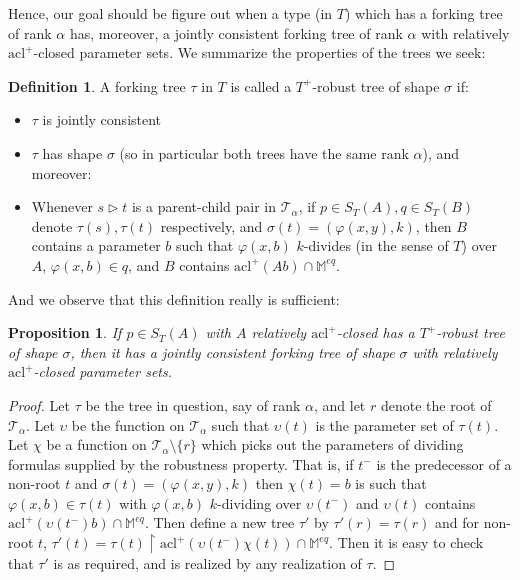 \documentclass{article}
\newtheorem{prop}[theorem]{Proposition}
\theoremstyle{remark}
\theoremstyle{definition}
\newtheorem{definition}[theorem]{Definition}
\begin{document}
Hence, our goal should be figure out when a type (in $T$) which has a forking tree of rank $\alpha$ has, moreover, a jointly consistent forking tree of rank $\alpha$ with relatively $\mathrm{acl}^+$-closed parameter sets. We summarize the properties of the trees we seek:
\begin{definition}
    A forking tree $\tau$ in $T$ is called a $T^+$-robust tree of shape $\sigma$ if:
    \begin{itemize}
        \item $\tau$ is jointly consistent

        \item $\tau$ has shape $\sigma$ (so in particular both trees have the same rank $\alpha$), and moreover:

        \item Whenever $s\triangleright t$ is a parent-child pair in $\mathcal{T}_\alpha$, if $p\in S_T(A), q\in S_T(B)$ denote $\tau(s),\tau(t)$ respectively, and $\sigma(t)=(\varphi(x,y),k)$, then $B$ contains a parameter $b$ such that $\varphi(x,b)$ $k$-divides (in the sense of $T$) over $A$, $\varphi(x,b)\in q$, and $B$ contains $\mathrm{acl}^+(Ab)\cap \mathbb{M}^{eq}$.
    \end{itemize}
\end{definition}

And we observe that this definition really is sufficient:
\begin{prop}\label{PruneProp}
    If $p\in S_T(A)$ with $A$ relatively $\mathrm{acl}^+$-closed has a $T^+$-robust tree of shape $\sigma$, then it has a jointly consistent forking tree of shape $\sigma$ with relatively $\mathrm{acl}^+$-closed parameter sets.
\end{prop}
\begin{proof}
    Let $\tau$ be the tree in question, say of rank $\alpha$, and let $r$ denote the root of $\mathcal{T}_\alpha$. Let $\upsilon$ be the function on $\mathcal{T}_\alpha$ such that $\upsilon(t)$ is the parameter set of $\tau(t)$. Let $\chi$ be a function on $\mathcal{T}_\alpha\setminus\{r\}$ which picks out the parameters of dividing formulas supplied by the robustness property. That is, if $t^-$ is the predecessor of a non-root $t$ and $\sigma(t)=(\varphi(x,y),k)$ then $\chi(t)=b$ is such that $\varphi(x,b)\in \tau(t)$ with $\varphi(x,b)$ $k$-dividing over $\upsilon(t^-)$ and $\upsilon(t)$ contains $\mathrm{acl}^+(\upsilon(t^-)b)\cap\mathbb{M}^{eq}$. Then define a new tree $\tau'$ by $\tau'(r)=\tau(r)$ and for non-root $t$, $\tau'(t)=\tau(t)\upharpoonright \mathrm{acl}^+(\upsilon(t^-)\chi(t))\cap\mathbb{M}^{eq}$. Then it is easy to check that $\tau'$ is as required, and is realized by any realization of $\tau$.
\end{proof}
\end{document}
